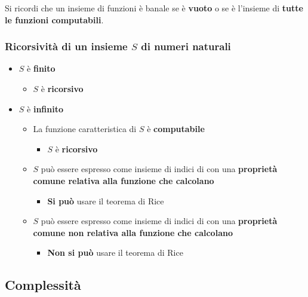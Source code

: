 \documentclass[italian, 10pt]{article}
\begin{document}
Si ricordi che un insieme di funzioni è banale se è \textbf{vuoto} o se è l'insieme di \textbf{tutte le funzioni computabili}.

\subsubsection[Ricorsività di un insieme S di numeri naturali]{Ricorsività di un insieme \(S\) di numeri naturali}

\begin{itemize}
  \item \(S\) è \textbf{finito}
        \begin{itemize}[label=\(\Rightarrow\)]
          \item \(S\) è \textbf{ricorsivo}
        \end{itemize}
  \item \(S\) è \textbf{infinito}
        \begin{itemize}
          \item La funzione caratteristica di \(S\) è \textbf{computabile}
                \begin{itemize}[label=\(\Rightarrow\)]
                  \item \(S\) è \textbf{ricorsivo}
                \end{itemize}
          \item \(S\) può essere espresso come insieme di indici di \TM con una \textbf{proprietà comune relativa alla funzione che calcolano}
                \begin{itemize}[label=\(\Rightarrow\)]
                  \item \textbf{Si può} usare il teorema di Rice
                \end{itemize}
          \item \(S\) può essere espresso come insieme di indici di \TM con una \textbf{proprietà comune non relativa alla funzione che calcolano}
                \begin{itemize}[label=\(\Rightarrow\)]
                  \item \textbf{Non si può} usare il teorema di Rice
                \end{itemize}
        \end{itemize}
\end{itemize}

\subsection{Complessità}
\end{document}
